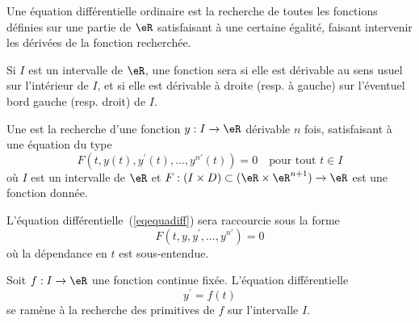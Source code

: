
Une équation différentielle ordinaire est la recherche de toutes les fonctions définies sur une partie de \( \eR\) satisfaisant à une certaine égalité, faisant intervenir les dérivées de la fonction recherchée.

\begin{definition}
	Si \( I\) est un intervalle de \( \eR\), une fonction sera  si elle est dérivable au sens usuel sur l'intérieur de \( I\), et si elle est dérivable à droite (resp. à gauche) sur l'éventuel bord gauche (resp. droit) de \( I\).
\end{definition}

\begin{definition}
	Une  est la recherche d'une fonction \( y : I \to \eR\) dérivable \( n\) fois, satisfaisant à une équation du type
	\begin{equation}\label{eqequadiff}
		F(t, y(t), y^\prime(t), \ldots, y^{n\prime}(t)) = 0 \quad \text{pour tout }t \in I
	\end{equation}
	où \( I\) est un intervalle de \( \eR\) et \begin{math}F : (I \times D) \subset (\eR\times\eR^{n+1})\to \eR\end{math} est une fonction donnée.
\end{definition}

\begin{remark}
	L'équation différentielle~(\ref{eqequadiff}) sera raccourcie sous la forme
	\begin{equation}
		F(t, y, y^\prime, \ldots, y^{n\prime}) = 0
	\end{equation}
	où la dépendance en \( t\) est sous-entendue.
\end{remark}

\begin{example}
	Soit \( f : I \to \eR\) une fonction continue fixée. L'équation différentielle
	\begin{equation}
		y^\prime = f(t)
	\end{equation}
	se ramène à la recherche des primitives de \( f\) sur l'intervalle \( I\).
\end{example}

